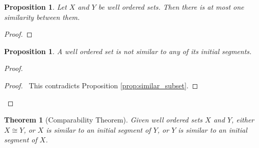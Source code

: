 \documentclass{report}
\let\qed\relax
\newtheorem{prop}[ax]{Proposition}
\newtheorem{thm}[ax]{Theorem}
\theoremstyle{definition}
\begin{document}
\begin{prop}
Let $X$ and $Y$ be well ordered sets. Then there is at most one similarity between them.
\end{prop}

\begin{proof}
\pf
{}
\qed
\end{proof}

\begin{prop}
A well ordered set is not similar to any of its initial segments.
\end{prop}

\begin{proof}
\pf
{}
\qedstep
\begin{proof}
	\pf\ This contradicts Proposition \ref{prop:similar_subset}.
\end{proof}
\qed
\end{proof}

\begin{thm}[Comparability Theorem]
Given well ordered sets $X$ and $Y$, either $X \cong Y$, or $X$ is similar to an initial segment of $Y$, or $Y$ is similar to an initial segment of $X$.
\end{thm}
\end{document}
